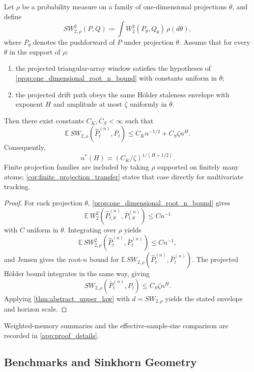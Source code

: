 \begin{corollary}
\label{cor:sliced_wasserstein_transfer}
Let $\rho$ be a probability measure on a family of one-dimensional projections
$\theta$, and define
\[
  SW_{2,\rho}^2(P,Q)
  \coloneqq \int W_2^2(P_{\theta},Q_{\theta})\,\rho(d\theta),
\]
where $P_{\theta}$ denotes the pushforward of $P$ under projection $\theta$.
Assume that for every $\theta$ in the support of $\rho$:
\begin{enumerate}[label=(\roman*)]
  \item the projected triangular-array window satisfies the hypotheses of
  \cref{prop:one_dimensional_root_n_bound} with constants uniform in $\theta$;
  \item the projected drift path obeys the same H\"older staleness envelope with
  exponent $H$ and amplitude at most $\zeta$ uniformly in $\theta$.
\end{enumerate}
Then there exist constants $C_K,C_S<\infty$ such that
\[
  \mathbb E\,SW_{2,\rho}\!\left(\widehat P_t^{(n)},P_t\right)
  \le C_K n^{-1/2} + C_S\zeta n^H.
\]
Consequently,
\[
  n^*(H)\asymp (C_K/\zeta)^{1/(H+1/2)}.
\]
Finite projection families are included by taking $\rho$ supported on finitely
many atoms; \cref{cor:finite_projection_transfer} states that case directly for
multivariate tracking.
\end{corollary}

\begin{proof}
For each projection $\theta$, \cref{prop:one_dimensional_root_n_bound} gives
\[
  \mathbb E\,W_2^2\!\left(\widehat P_{t,\theta}^{(n)},\bar P_{t,\theta}^{(n)}\right)
  \le C n^{-1}
\]
with $C$ uniform in $\theta$. Integrating over $\rho$ yields
\[
  \mathbb E\,SW_{2,\rho}^2\!\left(\widehat P_t^{(n)},\bar P_t^{(n)}\right)
  \le C n^{-1},
\]
and Jensen gives the root-$n$ bound for
$\mathbb E\,SW_{2,\rho}(\widehat P_t^{(n)},\bar P_t^{(n)})$. The projected
H\"older bound integrates in the same way, giving
\[
  SW_{2,\rho}\!\left(\bar P_t^{(n)},P_t\right)\le C_S\zeta n^H.
\]
Applying \cref{thm:abstract_upper_law} with $d=SW_{2,\rho}$ yields the stated
envelope and horizon scale.
\end{proof}

Weighted-memory summaries and the effective-sample-size comparison are recorded
in \cref{app:proof_details}.

\subsection{Benchmarks and Sinkhorn Geometry}

